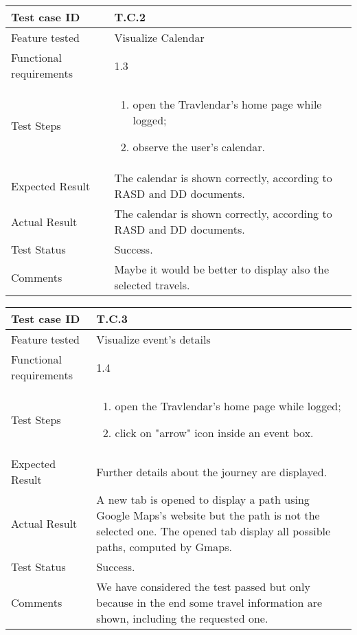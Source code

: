 \begin{table}[H]
	\begin{center}
		\begin{tabular}{ | p{} | p{} | }
		\hline
		Test case ID & T.C.2\\
		\hline
		Feature tested & Visualize Calendar  \\
		\hline
		Functional requirements & 1.3  \\
		\hline
		Test Steps & 
			\begin{enumerate}
				\item open the Travlendar's home page while logged;
				\item observe the user's calendar.
			\end{enumerate} \\
		\hline
		Expected Result & The calendar is shown correctly, according to RASD and DD documents.\\
		\hline
		Actual Result & The calendar is shown correctly, according to RASD and DD documents.\\ 
		\hline
		Test Status & \color{ForestGreen}Success.\\ 
		\hline
		Comments & Maybe it would be better to display also the selected travels.  \\ 
		\hline
		\end{tabular}
	\end{center}
\end{table}

\begin{table}[H]
	\begin{center}
		\begin{tabular}{ | p{} | p{} | }
		\hline
		Test case ID & T.C.3\\
		\hline
		Feature tested & Visualize event's details  \\
		\hline
		Functional requirements & 1.4  \\
		\hline
		Test Steps & 
			\begin{enumerate}
				\item open the Travlendar's home page while logged;
				\item click on "arrow" icon inside an event box.
			\end{enumerate} \\
		\hline
		Expected Result & Further details about the journey are displayed.\\
		\hline
		Actual Result & A new tab is opened to display a path using Google Maps's website but the path is not the selected one. The opened tab display all possible paths, computed by Gmaps.  \\ 
		\hline
		Test Status & \color{ForestGreen}Success.\\ 
		\hline
		Comments & We have considered the test passed but only because in the end some travel information are shown, including the requested one.\\ 
		\hline
		\end{tabular}
	\end{center}
\end{table}

